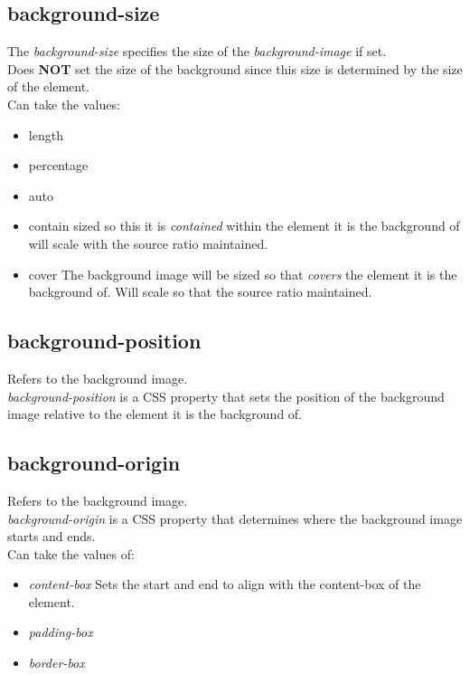 \documentclass[]{article}
\newcommand{\<}{\guilsinglleft}
\renewcommand{\>}{\guilsinglright}
\renewcommand{\it}[1]{\textit{#1}}
\renewcommand{\bf}[1]{\textbf{#1}}
\begin{document}
\subsection{background-size}
The \it{background-size} specifies the size of the \it{background-image} if set. 
\\
Does \bf{NOT} set the size of the background since this size is determined by the size of the element. 
\\
Can take the values:
\begin{itemize}
	\item length
	
	\item percentage 
	
	\item auto
	
	\item contain
	\subitem sized so this it is \it{contained} within the element it is the background of 
	\subitem will scale with the source ratio maintained.
	
	\item cover
	\subitem The background image will be sized so that \it{covers} the element it is the background of.
	\subitem Will scale so that the source ratio maintained.
\end{itemize}

\subsection{background-position}
Refers to the background image.
\\
\it{background-position} is a CSS property that sets the position of the background image relative to the element it is the background of.

\subsection{background-origin}
Refers to the background image.
\\
\it{background-origin} is a CSS property that determines where the background image starts and ends.
\\
Can take the values of:
\begin{itemize}
	\item \it{content-box}
	\subitem Sets the start and end to align with the content-box of the element.
	
	\item \it{padding-box}
	
	\item \it{border-box}
\end{itemize}
\end{document}
